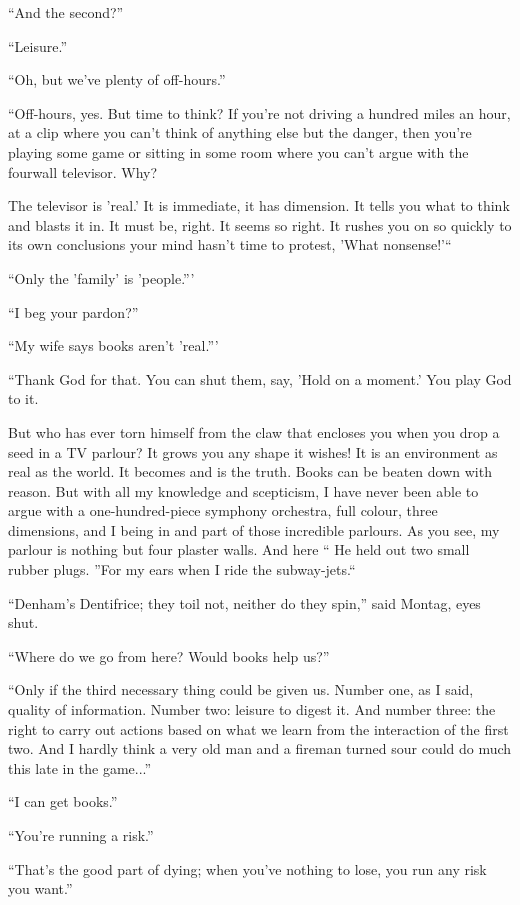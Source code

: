 \documentclass[11pt,openany]{book}
\begin{document}
``And the second?''

``Leisure.''

``Oh, but we've plenty of off-hours.''

``Off-hours, yes. But time to think? If you're not driving a hundred miles an hour, at a clip where you can't think of anything else but the danger, then you're playing some game or sitting in some room where you can't argue with the fourwall televisor. Why?

The televisor is 'real.' It is immediate, it has dimension. It tells you what to think and blasts it in. It must be, right. It seems so right. It rushes you on so quickly to its own conclusions your mind hasn't time to protest, 'What nonsense!'``

``Only the 'family' is 'people.'''

``I beg your pardon?''

``My wife says books aren't 'real.'''

``Thank God for that. You can shut them, say, 'Hold on a moment.' You play God to it.

But who has ever torn himself from the claw that encloses you when you drop a seed in a TV parlour? It grows you any shape it wishes! It is an environment as real as the world. It becomes and is the truth. Books can be beaten down with reason. But with all my knowledge and scepticism, I have never been able to argue with a one-hundred-piece symphony orchestra, full colour, three dimensions, and I being in and part of those incredible parlours. As you see, my parlour is nothing but four plaster walls. And here `` He held out two small rubber plugs. ''For my ears when I ride the subway-jets.``

``Denham's Dentifrice; they toil not, neither do they spin,'' said Montag, eyes shut.

``Where do we go from here? Would books help us?''

``Only if the third necessary thing could be given us. Number one, as I said, quality of information. Number two: leisure to digest it. And number three: the right to carry out actions based on what we learn from the interaction of the first two. And I hardly think a very old man and a fireman turned sour could do much this late in the game...''

``I can get books.''

``You're running a risk.''

``That's the good part of dying; when you've nothing to lose, you run any risk you want.''
\end{document}
